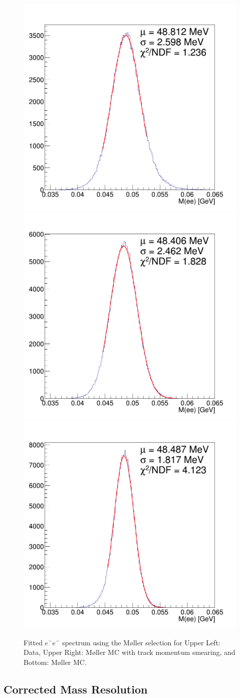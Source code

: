\begin{figure}[!hb]
    \centering
    \includegraphics[width=.45\textwidth]{figs/selection/mlr_recmassscsmfit_data_unconstrained.png}
    \includegraphics[width=.45\textwidth]{figs/selection/mlr_recmassscsmfit_mc_unconstrained.png}
    \includegraphics[width=.45\textwidth]{figs/selection/mlr_recmassfit_mc_unconstrained.png}
    \caption{Fitted $e^-e^-$ spectrum using the M\o ller selection for Upper Left: Data, Upper Right: M\o ller MC with track momentum smearing, and Bottom: M\o ller MC.
    }
    \label{fig:moller_mass_fit}
\end{figure}

\clearpage

\subsection{Corrected Mass Resolution}

